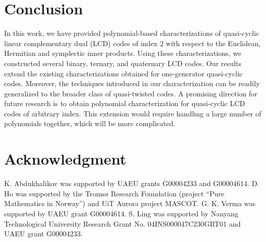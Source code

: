 \documentclass[a4paper,12pt]{article}
\begin{document}
 



\section*{Conclusion}
In this work, we have provided polynomial-based characterizations of quasi-cyclic linear complementary dual (LCD) codes of index $2$ with respect to the Euclidean, Hermitian and symplectic inner products. Using these characterizations, we constructed several binary, ternary, and quaternary LCD codes. Our results extend the existing characterizations obtained for one-generator quasi-cyclic codes. Moreover, the techniques introduced in our characterization can be readily generalized to the broader class of quasi-twisted codes. A promising direction for future research is to obtain polynomial characterization for quasi-cyclic LCD codes of arbitrary index. This extension would require handling a large number of polynomials together, which will be more complicated.

\section*{Acknowledgment}
	

K. Abdukhalikov was supported by UAEU grants G00004233 and G00004614.
D. Ho was supported by  the Tromsø Research Foundation (project “Pure Mathematics in Norway”) and  UiT Aurora project MASCOT. 
G. K. Verma was supported by UAEU grant G00004614. 
S. Ling was supported by Nanyang Technological University Research Grant No. 04INS000047C230GRT01 and UAEU grant G00004233.



 
\end{document}
